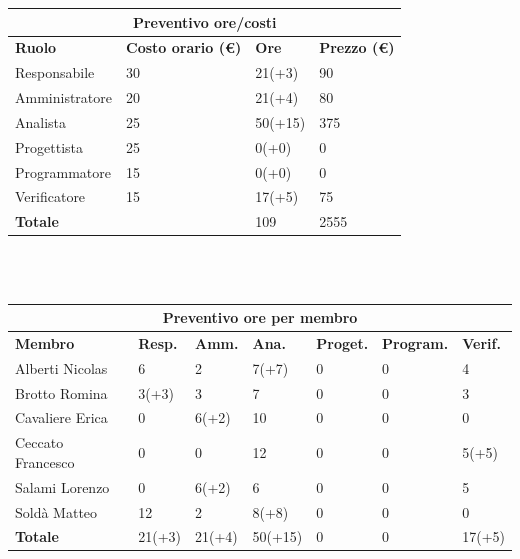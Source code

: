 \documentclass[a4paper, 12pt]{article}
\begin{document}
\begin{center}
	\begin{tabularx}{\textwidth}{|X|X|X|X|}
		\hline
		\multicolumn{4}{|c|}{\textbf{Preventivo ore/costi}}                                      \\
		\hline
		\hline
		\textbf{Ruolo}  & \textbf{Costo orario (\euro)} & \textbf{Ore} & \textbf{Prezzo (\euro)} \\
		\hline
		Responsabile    & 30                            & 21(+3)       & 90                      \\
		\hline
		Amministratore  & 20                            & 21(+4)       & 80                      \\
		\hline
		Analista        & 25                            & 50(+15)      & 375                     \\
		\hline
		Progettista     & 25                            & 0(+0)        & 0                       \\
		\hline
		Programmatore   & 15                            & 0(+0)        & 0                       \\
		\hline
		Verificatore    & 15                            & 17(+5)       & 75                      \\
		\hline
		\hline
		\textbf{Totale} &                               & 109          & 2555                    \\
		\hline
	\end{tabularx}\\[8pt]
	\mbox{}\\
\end{center}

\begin{center}
	\begin{tabularx}{\textwidth}{|X|X|X|X|X|X|X|}
		\hline
		\multicolumn{7}{|c|}{\textbf{Preventivo ore per membro}}                                      \\
		\hline
		\hline
		\textbf{Membro}  & \textbf{Resp.} & \textbf{Amm.} & \textbf{Ana.} &
		\textbf{Proget.} & \textbf{Program.} & \textbf{Verif.} \\
		\hline
		Alberti Nicolas    	&6 	&2	&7(+7)	&0	&0	&4	\\
		\hline
		Brotto Romina    	&3(+3) 	&3	&7	&0	&0	&3	\\
		\hline
		Cavaliere Erica    	&0 	&6(+2)  &10  &0 &0 &0	\\
		\hline
		Ceccato Francesco   &0 	&0  &12  &0 &0 &5(+5)	\\
		\hline
		Salami Lorenzo    	&0 	&6(+2)  &6 &0 &0 &5	\\
		\hline
		Soldà Matteo    	&12	&2  &8(+8)  &0 &0 &0	\\
		\hline
		\hline
		\textbf{Totale} 	& 21(+3) & 21(+4) & 50(+15) & 0 & 0 & 17(+5)	\\
		\hline
	\end{tabularx}\\[8pt]
	\mbox{}\\
\end{center}
\end{document}
